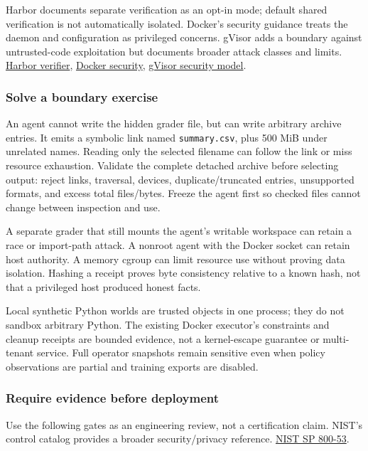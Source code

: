 \documentclass[
  11pt,
  letterpaper,
]{article}
\begin{document}
Harbor documents separate verification as an opt-in mode; default shared
verification is not automatically isolated. Docker's security guidance
treats the daemon and configuration as privileged concerns. gVisor adds
a boundary against untrusted-code exploitation but documents broader
attack classes and limits.
\href{https://docs.harborframework.com/tasks/separate-verifier}{Harbor
verifier}, \href{https://docs.docker.com/engine/security/}{Docker
security},
\href{https://gvisor.dev/docs/architecture_guide/security/}{gVisor
security model}.

\subsubsection{Solve a boundary
exercise}\label{solve-a-boundary-exercise}

An agent cannot write the hidden grader file, but can write arbitrary
archive entries. It emits a symbolic link named \texttt{summary.csv},
plus 500 MiB under unrelated names. Reading only the selected filename
can follow the link or miss resource exhaustion. Validate the complete
detached archive before selecting output: reject links, traversal,
devices, duplicate/truncated entries, unsupported formats, and excess
total files/bytes. Freeze the agent first so checked files cannot change
between inspection and use.

A separate grader that still mounts the agent's writable workspace can
retain a race or import-path attack. A nonroot agent with the Docker
socket can retain host authority. A memory cgroup can limit resource use
without proving data isolation. Hashing a receipt proves byte
consistency relative to a known hash, not that a privileged host
produced honest facts.

Local synthetic Python worlds are trusted objects in one process; they
do not sandbox arbitrary Python. The existing Docker executor's
constraints and cleanup receipts are bounded evidence, not a
kernel-escape guarantee or multi-tenant service. Full operator snapshots
remain sensitive even when policy observations are partial and training
exports are disabled.

\subsubsection{Require evidence before
deployment}\label{require-evidence-before-deployment}

Use the following gates as an engineering review, not a certification
claim. NIST's control catalog provides a broader security/privacy
reference.
\href{https://csrc.nist.gov/pubs/sp/800/53/r5/upd1/final}{NIST SP
800-53}.
\end{document}
